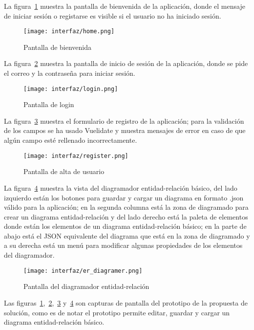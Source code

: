 La figura~\ref{img:prototipo-welcome} muestra la pantalla de bienvenida de la aplicación, donde el mensaje de iniciar sesión o registarse es visible si el usuario no ha iniciado sesión.

\begin{figure}[H]
    \centering
    \texttt{[image: interfaz/home.png]}
    \caption{Pantalla de bienvenida}
    \label{img:prototipo-welcome}
\end{figure}

La figura~\ref{img:prototipo-login} muestra la pantalla de inicio de sesión de la aplicación, donde se pide el correo y la contraseña para iniciar sesión.


\begin{figure}[H]
    \centering
    \texttt{[image: interfaz/login.png]}
    \caption{Pantalla de login}
    \label{img:prototipo-login}
\end{figure}
La figura~\ref{img:prototipo-signup} muestra el formulario de registro de la aplicación; para la validación de los campos se ha usado Vuelidate y muestra mensajes de error en caso de que algún campo esté rellenado incorrectamente.


\begin{figure}[H]
    \centering
    \texttt{[image: interfaz/register.png]}
    \caption{Pantalla de alta de usuario}
    \label{img:prototipo-signup}
\end{figure}
La figura~\ref{img:prototipo-er} muestra la vista del diagramador entidad-relación básico, del lado izquierdo están los botones para guardar y cargar un diagrama en formato .json válido para la aplicación; en la segunda columna está la zona de diagramado para crear un diagrama entidad-relación y del lado derecho está la paleta de elementos donde están los elementos de un diagrama entidad-relación básico; en la parte de abajo está el JSON equivalente del diagrama que está en la zona de diagramado y a su derecha está un menú para modificar algunas propiedades de los elementos del diagramador.

\begin{figure}[H]
    \centering
    \texttt{[image: interfaz/er\_diagramer.png]}
    \caption{Pantalla del diagramador entidad-relación}
    \label{img:prototipo-er}
\end{figure}



Las figuras~\ref{img:prototipo-welcome},~\ref{img:prototipo-login},~\ref{img:prototipo-signup} y~\ref{img:prototipo-er} son capturas de pantalla del prototipo de la propuesta de solución, como es de notar el prototipo permite editar, guardar y cargar un diagrama entidad-relación básico.

